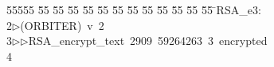 %
%
\begin{tabbing}
55555 \= 55 \= 55 \= 55 \= 55 \= 55 \= 55 \= 55 \= 55 \= 55 \= 55 \= 55 \= 55 \= \>RSA\_e3:\\[0pt]
2\>$\triangleright$\>(ORBITER)\ v\ 2\ \\[0pt]
3\>$\triangleright$\>$\triangleright$\>RSA\_encrypt\_text\ 2909\ 59264263\ 3\ encrypted\\[0pt]
4\>\end{tabbing}
